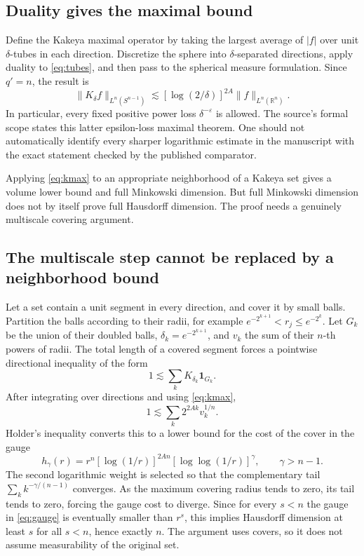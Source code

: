 \documentclass[11pt,a4paper]{article}
\numberwithin{equation}{section}
\theoremstyle{definition}
\theoremstyle{remark}
\newcommand{\R}{\mathbb R}
\newcommand{\eps}{\varepsilon}
\newcommand{\one}{\mathbf 1}
\begin{document}
\subsection{Duality gives the maximal bound}
Define the Kakeya maximal operator by taking the largest average of $|f|$
over unit $\delta$-tubes in each direction. Discretize the sphere into
$\delta$-separated directions, apply duality to \eqref{eq:tubes}, and then
pass to the spherical measure formulation. Since $q'=n$, the result is
\begin{equation}\label{eq:kmax}
 \|K_\delta f\|_{L^n(S^{n-1})}
 \lesssim [\log(2/\delta)]^{2A}\|f\|_{L^n(\R^n)}.
\end{equation}
In particular, every fixed positive power loss $\delta^{-\eps}$ is allowed.
The source's formal scope states this latter epsilon-loss maximal theorem.
One should not automatically identify every sharper logarithmic estimate in
the manuscript with the exact statement checked by the published comparator.

Applying \eqref{eq:kmax} to an appropriate neighborhood of a Kakeya set gives
a volume lower bound and full Minkowski dimension. But full Minkowski dimension
does not by itself prove full Hausdorff dimension. The proof needs a genuinely
multiscale covering argument.

\subsection{The multiscale step cannot be replaced by a neighborhood bound}
Let a set contain a unit segment in every direction, and cover it by small
balls. Partition the balls according to their radii, for example
$e^{-2^{k+1}}<r_j\le e^{-2^k}$. Let $G_k$ be the union of their doubled balls,
$\delta_k=e^{-2^{k+1}}$, and $v_k$ the sum of their $n$-th powers of radii.
The total length of a covered segment forces a pointwise directional inequality
of the form
\[
 1\lesssim\sum_k K_{\delta_k}\one_{G_k}.
\]
After integrating over directions and using \eqref{eq:kmax},
\[
 1\lesssim\sum_k 2^{2Ak}v_k^{1/n}.
\]
Holder's inequality converts this to a lower bound for the cost of the cover
in the gauge
\begin{equation}\label{eq:gauge}
 h_\gamma(r)=r^n[\log(1/r)]^{2An}
                  [\log\log(1/r)]^\gamma,
 \qquad \gamma>n-1.
\end{equation}
The second logarithmic weight is selected so that the complementary tail
$\sum_k k^{-\gamma/(n-1)}$ converges. As the maximum covering radius tends
to zero, its tail tends to zero, forcing the gauge cost to diverge. Since for
every $s<n$ the gauge in \eqref{eq:gauge} is eventually smaller than $r^s$,
this implies Hausdorff dimension at least $s$ for all $s<n$, hence exactly $n$.
The argument uses covers, so it does not assume measurability of the original
set.
\end{document}
